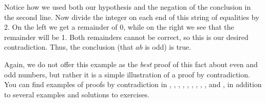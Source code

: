 %
Notice how we used both our hypothesis and the negation of the conclusion in the second line.   Now divide the integer on each end of this string of equalities by 2.  On the left we get a remainder of 0, while on the right we see that the remainder will be 1.  Both remainders cannot be correct, so this is our desired contradiction.  Thus, the conclusion (that $ab$ is odd) is true.\par\medskip
%
Again, we do not offer this example as the {\em best} proof of this fact about even and odd numbers, but rather it is a simple illustration of a proof by contradiction.  You can find examples of proofs by contradiction in 
,  %
,  %
,    %
,     %
,   %
,       %
,    %
,   %
,     %
and
,      %
%
in addition to several examples and solutions to exercises.


